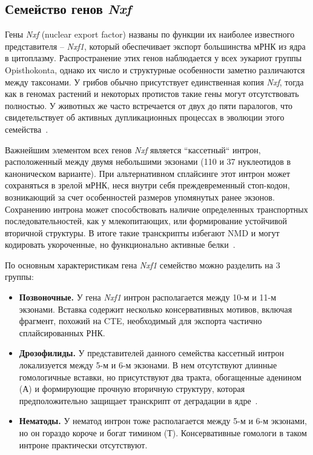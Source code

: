 \subsection{Семейство генов \textit{Nxf}}

Гены \textit{Nxf} (nuclear export factor) названы по функции их наиболее известного представителя – \textit{Nxf1}, который обеспечивает экспорт большинства мРНК из ядра в цитоплазму.
Распространение этих генов наблюдается у всех эукариот группы Opisthokonta, однако их число и структурные особенности заметно различаются между таксонами.
У грибов обычно присутствует единственная копия \textit{Nxf}, тогда как в геномах растений и некоторых протистов такие гены могут отсутствовать полностью.
У животных же часто встречается от двух до пяти паралогов, что свидетельствует об активных дупликационных процессах в эволюции этого семейства~\cite{Mamon2013}.

Важнейшим элементом всех генов \textit{Nxf} является ``кассетный`` интрон, расположенный между двумя небольшими экзонами (110 и 37 нуклеотидов в каноническом варианте).
При альтернативном сплайсинге этот интрон может сохраняться в зрелой мРНК, неся внутри себя преждевременный стоп-кодон, возникающий за счет особенностей размеров упомянутых ранее экзонов.
Сохранению интрона может способствовать наличие определенных транспортных последовательностей, как у млекопитающих, или формирование устойчивой вторичной структуры.
В итоге такие транскрипты избегают NMD и могут кодировать укороченные, но функционально активные белки~\cite{Mamon2013,Golubkova2012}.

По основным характеристикам гена \textit{Nxf1} семейство можно разделить на 3 группы:

\begin{itemize}
  \item \textbf{Позвоночные.} У гена \textit{Nxf1} интрон располагается между 10-м и 11-м экзонами. Вставка содержит несколько консервативных мотивов, включая фрагмент, похожий на CTE, необходимый для экспорта частично сплайсированных РНК.
  \item \textbf{Дрозофилиды.} У представителей данного семейства кассетный интрон локализуется между 5-м и 6-м экзонами. В нем отсутствуют длинные гомологичные вставки, но присутствуют два тракта, обогащенные аденином (А) и формирующие прочную вторичную структуру, которая предположительно защищает транскрипт от деградации в ядре~\cite{Mamon2013}.
  \item \textbf{Нематоды.} У нематод интрон тоже располагается между 5-м и 6-м экзонами, но он гораздо короче и богат тимином (Т). Консервативные гомологи в таком интроне практически отсутствуют.
\end{itemize}

